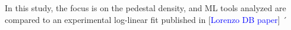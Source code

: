 \documentclass[a4paper, twoside, final, 12pt]{article}
\begin{document}
In this study, the focus is on the pedestal density, and ML tools analyzed are compared to an experimental log-linear fit published in [\textcolor{blue}{Lorenzo DB paper}]
´

\end{document}
